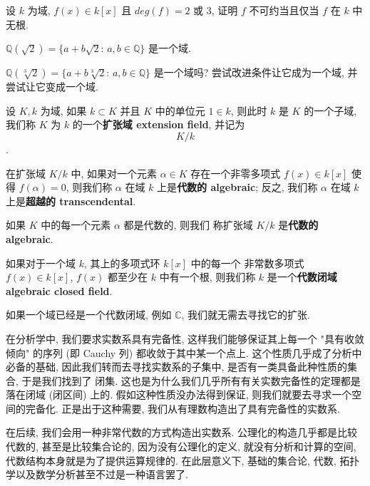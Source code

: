 \documentclass[UTF8]{book}
\begin{document}
\begin{exercise}
    设 $k$ 为域, $f(x) \in k[x]$ 且 $deg(f) = 2$ 或 3, 
    证明 $f$ 不可约当且仅当 $f$ 在 $k$ 中无根. 
\end{exercise}

\begin{exercise}
    $\mathbb{Q}(\sqrt{2}) = \{a+b\sqrt{2}:\,a,b\in \mathbb{Q}\}$ 是一个域. 
\end{exercise}

\begin{exercise}
    $\mathbb{Q}(\sqrt[3]{2}) = \{a+b\sqrt[3]{2}:\,a,b\in \mathbb{Q}\}$ 
    是一个域吗? 尝试改进条件让它成为一个域, 并尝试让它变成一个域.  
\end{exercise}

\begin{definition}
    设 $K,k$ 为域, 如果 $ k \subset K$ 并且 $K$ 中的单位元 $1 \in k$, 
    则此时 $k$ 是 $K$ 的一个子域, 我们称 $K$ 为 $k$ 的一个\textbf{扩张域
    extension field}, 并记为 $$ K/k $$.

    在扩张域 $ K/k $ 中, 如果对一个元素 $\alpha \in K$ 存在一个非零多项式 
    $f(x) \in k[x]$ 使得 $f(\alpha) = 0$, 则我们称 $\alpha$ 在域 $k$ 
    上是\textbf{代数的 algebraic}; 反之, 我们称 $\alpha$ 在域 $k$ 
    上是\textbf{超越的 transcendental}. 
    
    如果 $K$ 中的每一个元素 $\alpha$ 都是代数的, 则我们
    称扩张域 $K/k$ 是\textbf{代数的 algebraic}.

    如果对于一个域 $k$, 其上的多项式环 $k[x]$ 中的每一个
    非常数多项式 $f(x) \in k[x]$, 
    $f(x)$ 都至少在 $k$ 中有一个根, 则我们称 $k$ 是一个\textbf{代数闭域 
    algebraic closed field}. 
\end{definition}

如果一个域已经是一个代数闭域, 例如 $\mathbb{C}$, 我们就无需去寻找它的扩张. 

在分析学中, 我们要求实数系具有完备性, 这样我们能够保证其上每一个 "具有收敛倾向" 
的序列 (即 Cauchy 列) 都收敛于其中某一个点上. 这个性质几乎成了分析中必备的基础, 
因此我们转而去寻找实数系的子集中, 是否有一类具备此种性质的集合, 于是我们找到了
闭集. 这也是为什么我们几乎所有有关实数完备性的定理都是落在闭域 (闭区间) 上的. 
假如这种性质没办法得到保证, 则我们就要去寻求一个空间的完备化. 
正是出于这种需要, 我们从有理数构造出了具有完备性的实数系. 

在后续, 我们会用一种非常代数的方式构造出实数系. 
公理化的构造几乎都是比较代数的, 甚至是比较集合论的, 因为没有公理化的定义, 
就没有分析和计算的空间, 代数结构本身就是为了提供运算规律的. 
在此层意义下, 基础的集合论, 代数, 拓扑学以及数学分析甚至不过是一种语言罢了. 
\end{document}
